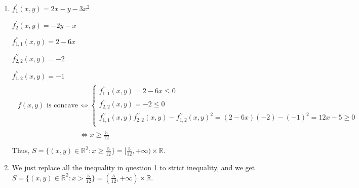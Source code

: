 \documentclass[letterpaper,10pt,english]{jupyterBook}
\begin{document}
\sphinxAtStartPar
{}
\begin{enumerate}
%
\item {} 
\sphinxAtStartPar
\(f^{\prime}_{1}(x, y) = 2x - y -3x^2\)

\sphinxAtStartPar
\(f^{\prime}_{2}(x, y) = -2y - x\)

\sphinxAtStartPar
\(f^{\prime\prime}_{1, 1}(x, y) = 2 - 6x\)

\sphinxAtStartPar
\(f^{\prime\prime}_{2, 2}(x, y) = -2\)

\sphinxAtStartPar
\(f^{\prime\prime}_{1, 2}(x, y) = -1\)
\begin{equation*}
\begin{split}
   \begin{aligned}
   f(x, y) \text{ is concave } &\iff
   \begin{cases}
    f^{\prime\prime}_{1, 1}(x, y) = 2 - 6x \leq 0 \\
    f^{\prime\prime}_{2, 2}(x, y) = -2 \leq 0 \\
    f^{\prime\prime}_{1, 1}(x, y) f^{\prime\prime}_{2, 2}(x, y) - f^{\prime\prime}_{1, 2}(x, y)^2 = (2 - 6x)(-2) - (-1)^2 = 12x - 5 \geq 0 \\
   \end{cases} \\
   &\iff x \geq \frac{5}{12}\\
   \end{aligned}
   \end{split}
\end{equation*}
\sphinxAtStartPar
Thus, \(S = \{(x, y) \in \mathbb{R^2}: x \geq \frac{5}{12}\}= [\frac{5}{12}, +\infty) \times \mathbb{R}\).

\item {} 
\sphinxAtStartPar
We just replace all the inequality in question 1 to strict inequality, and we get \(S = \{(x, y) \in \mathbb{R^2}: x > \frac{5}{12}\}= (\frac{5}{12}, +\infty) \times \mathbb{R}\).

\end{enumerate}







\renewcommand{\indexname}{Index}
\printindex
\end{document}
